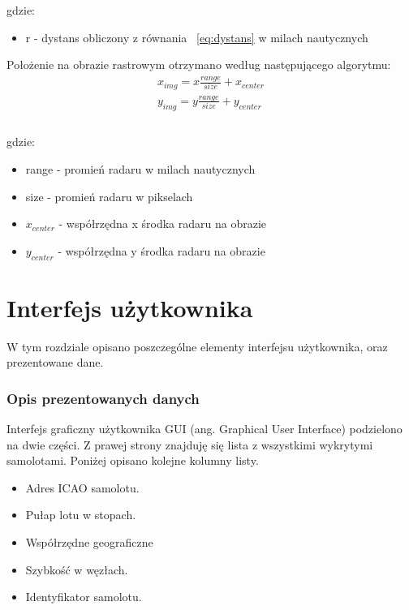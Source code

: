 \documentclass[eng,printmode]{mgr}
\begin{document}
\noindent
gdzie:
\begin{itemize}
\item r - dystans obliczony z równania ~\ref{eq:dystans} w milach nautycznych
\end{itemize}
\vskip 0.5cm
\noindent
Położenie na obrazie rastrowym otrzymano według następującego algorytmu:
\begin{equation}
\renewcommand*{\arraystretch}{1.3}
\begin{array}{ll}
x_{img} = x \frac{range}{size} + x_{center}\\
y_{img} = y \frac{range}{size} + y_{center}\\
\end{array}
\end{equation}
\\

\noindent
gdzie:
\begin{itemize}
\item range - promień radaru w milach nautycznych
\item size - promień radaru w pikselach
\item $x_{center}$ - współrzędna x środka radaru na obrazie
\item $y_{center}$ - współrzędna y środka radaru na obrazie
\end{itemize}

\chapter{Interfejs użytkownika}
W tym rozdziale opisano poszczególne elementy interfejsu użytkownika, oraz prezentowane dane.

\subsection*{Opis prezentowanych danych}
Interfejs graficzny użytkownika GUI (ang. Graphical User Interface) podzielono na dwie części. Z prawej strony znajduję się lista z wszystkimi wykrytymi samolotami. 
Poniżej opisano kolejne kolumny listy.
\begin{itemize}
\item Adres ICAO samolotu.
\item Pułap lotu w stopach.
\item Współrzędne geograficzne
\item Szybkość w węzłach.
\item Identyfikator samolotu.
\end{itemize}
\end{document}
